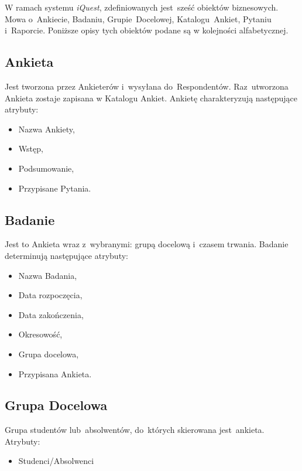 W ramach systemu \textit{iQuest}, zdefiniowanych jest~sześć obiektów biznesowych. Mowa o~Ankiecie, Badaniu, Grupie~Docelowej, Katalogu~Ankiet, Pytaniu i~Raporcie. Poniższe opisy tych obiektów podane są w kolejności alfabetycznej.

\subsection{Ankieta}
\label{Chapter231}

Jest tworzona przez Ankieterów i~wysyłana do~Respondentów. Raz~utworzona Ankieta zostaje zapisana w Katalogu Ankiet. Ankietę charakteryzują następujące atrybuty:

\begin{itemize}
\item Nazwa Ankiety,
\item Wstęp,
\item Podsumowanie,
\item Przypisane Pytania.
\end{itemize}

\subsection{Badanie}
\label{Chapter232}

Jest to Ankieta wraz z~wybranymi: grupą docelową i~czasem trwania. Badanie determinują następujące atrybuty:

\begin{itemize}
\item Nazwa Badania,
\item Data rozpoczęcia,
\item Data zakończenia,
\item Okresowość,
\item Grupa docelowa,
\item Przypisana Ankieta.
\end{itemize}

\subsection{Grupa Docelowa}
\label{Chapter233}

Grupa studentów lub~absolwentów, do~których skierowana jest~ankieta. Atrybuty:

\begin{itemize}
\item Studenci\slash Absolwenci
\end{itemize}

